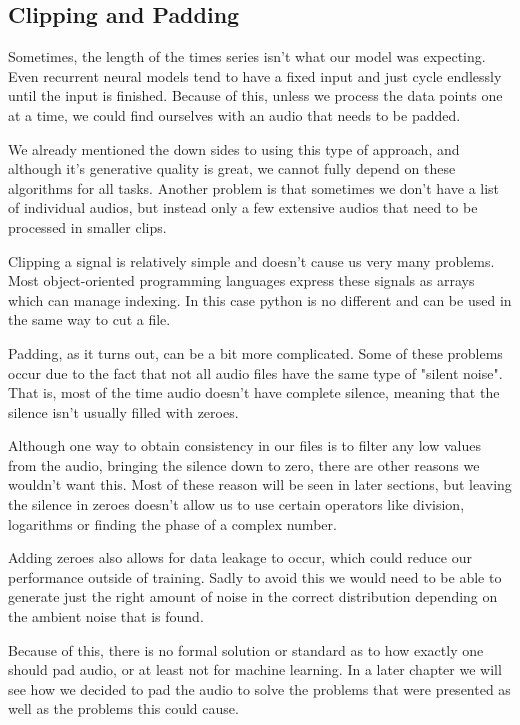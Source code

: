\documentclass{book}
\begin{document}
\subsection{Clipping and Padding}
\qquad Sometimes, the length of the times series isn't what our model was expecting.
Even recurrent neural models tend to have a fixed input and just cycle endlessly until the input is finished.
Because of this, unless we process the data points one at a time, we could find ourselves with an audio that needs to be padded.
\par
We already mentioned the down sides to using this type of approach, and although it's generative quality is great, we cannot fully depend on these algorithms for all tasks.
Another problem is that sometimes we don't have a list of individual audios, but instead only a few extensive audios that need to be processed in smaller clips.
\par
Clipping a signal is relatively simple and doesn't cause us very many problems.
Most object-oriented programming languages express these signals as arrays which can manage indexing.
In this case python is no different and can be used in the same way to cut a file.
\par
Padding, as it turns out, can be a bit more complicated.
Some of these problems occur due to the fact that not all audio files have the same type of "silent noise".
That is, most of the time audio doesn't have complete silence, meaning that the silence isn't usually filled with zeroes.
\par
Although one way to obtain consistency in our files is to filter any low values from the audio, bringing the silence down to zero, there are other reasons we wouldn't want this.
Most of these reason will be seen in later sections, but leaving the silence in zeroes doesn't allow us to use certain operators like division, logarithms or finding the phase of a complex number.
\par
Adding zeroes also allows for data leakage to occur, which could reduce our performance outside of training.  %
Sadly to avoid this we would need to be able to generate just the right amount of noise in the correct distribution depending on the ambient noise that is found.
\par
Because of this, there is no formal solution or standard as to how exactly one should pad audio, or at least not for machine learning.
In a later chapter we will see how we decided to pad the audio to solve the problems that were presented as well as the problems this could cause.
\end{document}
